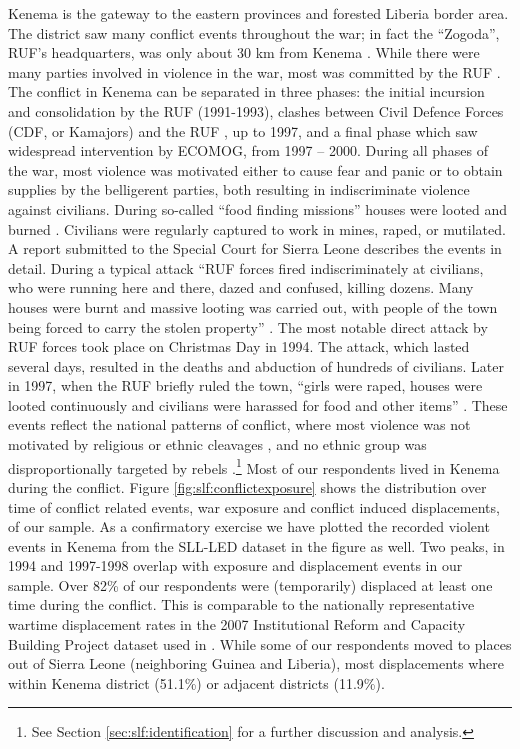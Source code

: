 Kenema is the gateway to the eastern provinces and forested Liberia border area. The district saw many conflict events throughout the war; in fact the “Zogoda”, RUF’s headquarters, was only about 30 km from Kenema \citep{Peters2011}. While there were many parties involved in violence in the war, most was committed by the RUF \citep{Conibere2004}.  The conflict in Kenema can be separated in three phases: the initial incursion and consolidation by the RUF (1991-1993), clashes between Civil Defence Forces (CDF, or Kamajors) and the RUF , up to 1997, and a final phase which saw widespread intervention by ECOMOG, from 1997 – 2000. During all phases of the war, most violence was motivated either to cause fear and panic or to obtain supplies by the belligerent parties, both resulting in indiscriminate violence against civilians. During so-called “food finding missions” houses were looted and burned \citep[for a broader discussion on such tactics, refer to Kalyvas ][]{Kalyvas2006}. Civilians were regularly captured to work in mines, raped, or mutilated. A report submitted to the Special Court for Sierra Leone \citep{Smith2004a} describes the events in detail. During a typical attack “RUF forces fired indiscriminately at civilians, who were running here and there, dazed and confused, killing dozens. Many houses were burnt and massive looting was carried out, with people of the town being forced to carry the stolen property” \citep[p.~303]{Smith2004a}. The most notable direct attack by RUF forces took place on Christmas Day in 1994. The attack, which lasted several days, resulted in the deaths and abduction of hundreds of civilians. Later in 1997, when the RUF briefly ruled the town, “girls were raped, houses were looted continuously and civilians were harassed for food and other items” \citep[p.~318]{Smith2004a}. These events reflect the national patterns of conflict, where most violence was not motivated by religious or ethnic cleavages \citep[see][]{Bellows2009b}, and no ethnic group was disproportionally targeted by rebels \citep{Conibere2004,Humphreys2006}.\footnote{See Section \ref{sec:slf:identification} for a further discussion and analysis.} 
Most of our respondents lived in Kenema during the conflict. Figure \ref{fig:slf:conflictexposure} shows the distribution over time of conflict related events, war exposure and conflict induced displacements, of our sample. As a confirmatory exercise we have plotted the recorded violent events in Kenema from the SLL-LED dataset \citep{Bruijne2014} in the figure as well. Two peaks, in 1994 and 1997-1998 overlap with exposure and displacement events in our sample. Over 82\% of our respondents were (temporarily) displaced at least one time during the conflict. This is comparable to the nationally representative wartime displacement rates in the 2007 Institutional Reform and Capacity Building Project dataset  used in \cite{Bellows2009b}. While some of our respondents moved to places out of Sierra Leone (neighboring Guinea and Liberia), most displacements where within Kenema district (51.1\%) or adjacent districts (11.9\%). 



